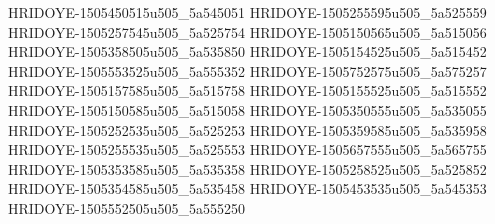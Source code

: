 HRIDOYE-1505450515u505_5a545051
HRIDOYE-1505255595u505_5a525559
HRIDOYE-1505257545u505_5a525754
HRIDOYE-1505150565u505_5a515056
HRIDOYE-1505358505u505_5a535850
HRIDOYE-1505154525u505_5a515452
HRIDOYE-1505553525u505_5a555352
HRIDOYE-1505752575u505_5a575257
HRIDOYE-1505157585u505_5a515758
HRIDOYE-1505155525u505_5a515552
HRIDOYE-1505150585u505_5a515058
HRIDOYE-1505350555u505_5a535055
HRIDOYE-1505252535u505_5a525253
HRIDOYE-1505359585u505_5a535958
HRIDOYE-1505255535u505_5a525553
HRIDOYE-1505657555u505_5a565755
HRIDOYE-1505353585u505_5a535358
HRIDOYE-1505258525u505_5a525852
HRIDOYE-1505354585u505_5a535458
HRIDOYE-1505453535u505_5a545353
HRIDOYE-1505552505u505_5a555250
